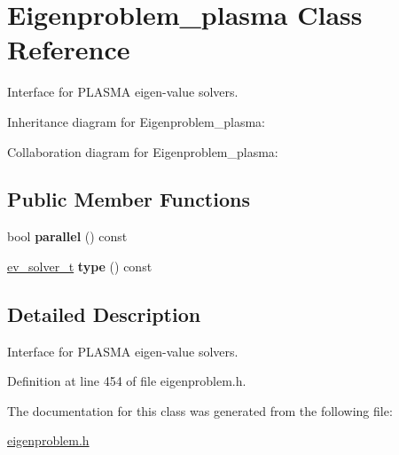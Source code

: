 \hypertarget{class_eigenproblem__plasma}{}\section{Eigenproblem\+\_\+plasma Class Reference}
\label{class_eigenproblem__plasma}


Interface for P\+L\+A\+S\+M\+A eigen-\/value solvers.  




Inheritance diagram for Eigenproblem\+\_\+plasma\+:


Collaboration diagram for Eigenproblem\+\_\+plasma\+:
\subsection*{Public Member Functions}
\begin{DoxyCompactItemize}
\item 
\hypertarget{class_eigenproblem__plasma_ab4e5b1e5623f2acfe847f3c674305711}{}bool {\bfseries parallel} () const \label{class_eigenproblem__plasma_ab4e5b1e5623f2acfe847f3c674305711}

\item 
\hypertarget{class_eigenproblem__plasma_aa23930a439d37767da2b1de290a65419}{}\hyperlink{eigenproblem_8h_a203f2c57422a6e64834e6e9ab85982bf}{ev\+\_\+solver\+\_\+t} {\bfseries type} () const \label{class_eigenproblem__plasma_aa23930a439d37767da2b1de290a65419}

\end{DoxyCompactItemize}


\subsection{Detailed Description}
Interface for P\+L\+A\+S\+M\+A eigen-\/value solvers. 

Definition at line 454 of file eigenproblem.\+h.



The documentation for this class was generated from the following file\+:\begin{DoxyCompactItemize}
\item 
\hyperlink{eigenproblem_8h}{eigenproblem.\+h}\end{DoxyCompactItemize}
